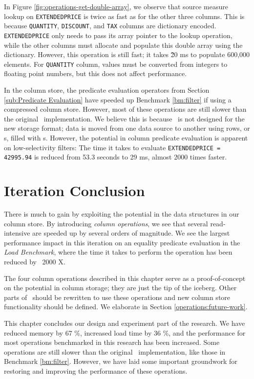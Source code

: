 In Figure \ref{fig:operations-get-double-array}, we observe that source measure lookup on \texttt{EXTENDEDPRICE} is twice as fast as for the other three columns. This is because \texttt{QUANTITY}, \texttt{DISCOUNT}, and \texttt{TAX} columns are dictionary encoded. \texttt{EXTENDEDPRICE} only needs to pass its array pointer to the lookup operation, while the other columns must allocate and populate this double array using the dictionary. However, this operation is still fast; it takes \~20 ms to populate 600,000 elements. For \texttt{QUANTITY} column, values must be converted from integers to floating point numbers, but this does not affect performance.

In the column store, the predicate evaluation operators from Section \ref{sub:Predicate Evaluation} have speeded up Benchmark \ref{bm:filter} if using a compressed column store. However, most of these operations are still slower than the original \gap~implementation. We believe this is because \gap~is not designed for the new storage format; data is moved from one data source to another using rows, or s, filled with s. However, the potential in column predicate evaluation is apparent on low-selectivity filters: The time it takes to evaluate \texttt{EXTENDEDPRICE = 42995.94} is reduced from 53.3 seconds to 29 ms, almost 2000 times faster.

\section{Iteration Conclusion}
\label{sec:Chapter Conclusion}
There is much to gain by exploiting the potential in the data structures in our column store. By introducing \textit{column operations}, we see that several read-intensive are speeded up by several orders of magnitude. We see the largest performance impact in this iteration on an equality predicate evaluation in the \textit{Load Benchmark}, where the time it takes to perform the operation has been reduced by ~2000 X.

The four column operations described in this chapter serve as a proof-of-concept on the potential in column storage; they are just the tip of the iceberg. Other parts of \gap~should be rewritten to use these operations and new column store functionality should be defined. We elaborate in Section \ref{operations:future-work}.

This chapter concludes our design and experiment part of the research. We have reduced memory by 67 \%, increased load time by 36 \%, and the performance for most operations benchmarked in this research has been increased. Some operations are still slower than the original \gap~implementation, like those in Benchmark \ref{bm:filter}. However, we have laid some important groundwork for restoring and improving the performance of these operations.

